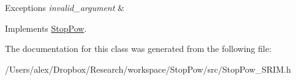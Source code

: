 \begin{DoxyExceptions}{Exceptions}
{\em invalid\-\_\-argument} & \\
\hline
\end{DoxyExceptions}


Implements \hyperlink{class_stop_pow}{Stop\-Pow}.



The documentation for this class was generated from the following file\-:\begin{DoxyCompactItemize}
\item 
/\-Users/alex/\-Dropbox/\-Research/workspace/\-Stop\-Pow/src/Stop\-Pow\-\_\-\-S\-R\-I\-M.\-h\end{DoxyCompactItemize}
